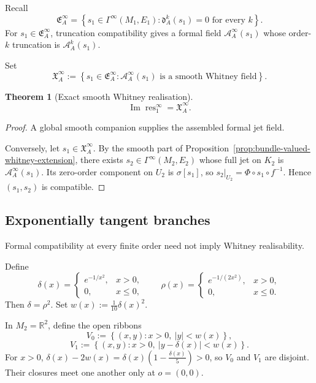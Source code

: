 \documentclass[11pt]{article}
\theoremstyle{plain}
\newtheorem{theorem}{Theorem}[section]
\theoremstyle{definition}
\begin{document}
Recall
\[
  \mathfrak E_A^\infty
  =
  \left\{
    s_1\in\Gamma^\infty(M_1,E_1):
    \mathfrak d_A^k(s_1)=0
    \text{ for every }k
  \right\}.
\]
For
\(s_1\in\mathfrak E_A^\infty\),
truncation compatibility gives a formal field \(\mathcal A_A^\infty(s_1)\) whose order-\(k\) truncation is
\(\mathcal A_A^k(s_1)\).

Set
\[
  \mathfrak X_A^\infty
  :=
  \left\{
    s_1\in\mathfrak E_A^\infty:
    \mathcal A_A^\infty(s_1)
    \text{ is a smooth Whitney field}
  \right\}.
\]

\begin{theorem}[Exact smooth Whitney realisation]
\label{thm:exact-smooth-whitney}
\[
  \boxed{
  \operatorname{Im}\operatorname{res}_1^\infty
  =
  \mathfrak X_A^\infty.
  }
\]
\end{theorem}

\begin{proof}
A global smooth companion supplies the assembled formal jet field.

Conversely, let
\(s_1\in\mathfrak X_A^\infty\).
By the smooth part of
Proposition~\ref{prop:bundle-valued-whitney-extension},
there exists \(s_2\in\Gamma^\infty(M_2,E_2)\) whose full jet on \(K_2\) is
\(\mathcal A_A^\infty(s_1)\).
Its zero-order component on \(U_2\) is \(\sigma[s_1]\), so
\(s_2|_{U_2} = \Phi\circ s_1\circ f^{-1}\).
Hence \((s_1,s_2)\) is compatible.
\end{proof}

\subsection{Exponentially tangent branches}
\label{subsec:exponentially-tangent-branches}

Formal compatibility at every finite order need not imply Whitney
realisability.

Define
\[
  \delta(x)
  =
  \begin{cases}
    e^{-1/x^2},&x>0,\\
    0,&x\leq0,
  \end{cases}
  \qquad
  \rho(x)
  =
  \begin{cases}
    e^{-1/(2x^2)},&x>0,\\
    0,&x\leq0.
  \end{cases}
\]
Then
\(\delta=\rho^2\).
Set
\(w(x) := \frac{1}{10}\delta(x)^2\).

In
\(M_2=\mathbb R^2\),
define the open ribbons
\[
  V_0
  :=
  \left\{
    (x,y):
    x>0,\
    |y|<w(x)
  \right\},
\]
\[
  V_1
  :=
  \left\{
    (x,y):
    x>0,\
    |y-\delta(x)|<w(x)
  \right\}.
\]
For \(x>0\),
\(\delta(x)-2w(x) = \delta(x) \left( 1-\frac{\delta(x)}5 \right) >0\),
so \(V_0\) and \(V_1\) are disjoint. Their closures meet one another
only at
\(o=(0,0)\).
\end{document}
